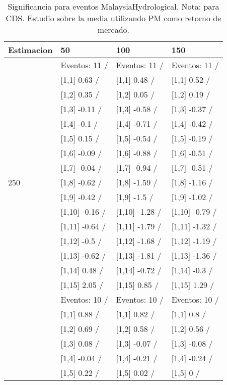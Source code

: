 \begin{table}

\caption{Significancia para eventos MalaysiaHydrological. Nota: para CDS. Estudio sobre la media utilizando PM como retorno de mercado.}
\centering
\begin{tabular}[t]{llll}
\toprule
Estimacion & 50 & 100 & 150\\
\midrule
 & Eventos:  11 / & Eventos:  11 / & Eventos:  11 /\\
 & {}[1,1] 0.63  / & {}[1,1] 0.48  / & {}[1,1] 0.52  /\\
 & {}[1,2] 0.35  / & {}[1,2] 0.05  / & {}[1,2] 0.19  /\\
 & {}[1,3] -0.11  / & {}[1,3] -0.58  / & {}[1,3] -0.37  /\\
 & {}[1,4] -0.1  / & {}[1,4] -0.71  / & {}[1,4] -0.42  /\\
\addlinespace
 & {}[1,5] 0.15  / & {}[1,5] -0.54  / & {}[1,5] -0.19  /\\
 & {}[1,6] -0.09  / & {}[1,6] -0.88  / & {}[1,6] -0.51  /\\
 & {}[1,7] -0.04  / & {}[1,7] -0.94  / & {}[1,7] -0.51  /\\
250 & {}[1,8] -0.62  / & {}[1,8] -1.59  / & {}[1,8] -1.16  /\\
 & {}[1,9] -0.42  / & {}[1,9] -1.5  / & {}[1,9] -1.02  /\\
\addlinespace
 & {}[1,10] -0.16  / & {}[1,10] -1.28  / & {}[1,10] -0.79  /\\
 & {}[1,11] -0.64  / & {}[1,11] -1.79  / & {}[1,11] -1.32  /\\
 & {}[1,12] -0.5  / & {}[1,12] -1.68  / & {}[1,12] -1.19  /\\
 & {}[1,13] -0.62  / & {}[1,13] -1.81  / & {}[1,13] -1.36  /\\
 & {}[1,14] 0.48  / & {}[1,14] -0.72  / & {}[1,14] -0.3  /\\
\addlinespace
 & {}[1,15] 2.05  / & {}[1,15] 0.85  / & {}[1,15] 1.29  /\\
 & Eventos:  10 / & Eventos:  10 / & Eventos:  10 /\\
 & {}[1,1] 0.88  / & {}[1,1] 0.82  / & {}[1,1] 0.8  /\\
 & {}[1,2] 0.69  / & {}[1,2] 0.58  / & {}[1,2] 0.56  /\\
 & {}[1,3] 0.08  / & {}[1,3] -0.07  / & {}[1,3] -0.08  /\\
\addlinespace
 & {}[1,4] -0.04  / & {}[1,4] -0.21  / & {}[1,4] -0.24  /\\
 & {}[1,5] 0.22  / & {}[1,5] 0.02  / & {}[1,5] 0  /\\

\end{tabular}
\end{table}
